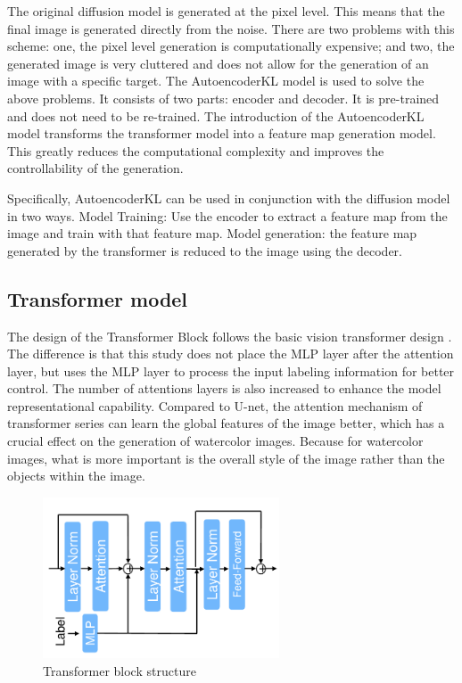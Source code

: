 \documentclass{acsman}
\begin{document}
The original diffusion model is generated at the pixel level. This means that the final image is generated directly from the noise. There are two problems with this scheme: one, the pixel level generation is computationally expensive; and two, the generated image is very cluttered and does not allow for the generation of an image with a specific target.
The AutoencoderKL model is used to solve the above problems. It consists of two parts: encoder and decoder. It is pre-trained and does not need to be re-trained. The introduction of the AutoencoderKL model transforms the transformer model into a feature map generation model. This greatly reduces the computational complexity and improves the controllability of the generation.

Specifically, AutoencoderKL can be used in conjunction with the diffusion model in two ways. Model Training: Use the encoder to extract a feature map from the image and train with that feature map. Model generation: the feature map generated by the transformer is reduced to the image using the decoder.

\subsection{Transformer model}
The design of the Transformer Block follows the basic vision transformer design \cite{dosovitskiy2020image}. The difference is that this study does not place the MLP layer after the attention layer, but uses the MLP layer to process the input labeling information for better control. The number of attentions layers is also increased to enhance the model representational capability. Compared to U-net, the attention mechanism of transformer series can learn the global features of the image better, which has a crucial effect on the generation of watercolor images. Because for watercolor images, what is more important is the overall style of the image rather than the objects within the image.
\begin{figure}[h]
    \centering
    \includegraphics[width=7cm]{image/traB.pdf}
    \caption{Transformer block structure}
    \label{fig:traB}
\end{figure}
\end{document}
